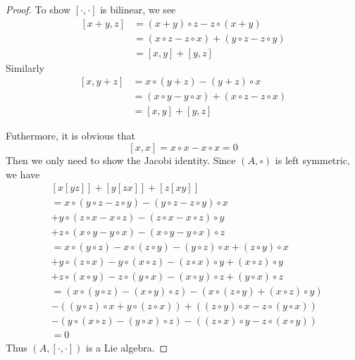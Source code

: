 \documentclass[../main.tex]{subfiles}
\begin{document}
\begin{proof}
    To show \(  \left[ \cdot ,\cdot  \right]   \) is bilinear, we  see  \[
    \begin{aligned}
    \left[ x+ y,z \right]&= \left( x+ y \right)\circ z- z\circ\left( x+ y \right)    \\ 
     &= \left( x\circ z - z\circ x \right) +\left(  y\circ z - z \circ y \right) \\ 
      &=  \left[ x,y \right]+ \left[ y,z \right]  
    \end{aligned}
    \]  Similarly \[
    \begin{aligned}
    \left[ x,y+ z \right]&= x\circ \left( y+ z \right)- \left( y+ z \right)\circ x\\ 
     &= \left( x\circ y- y\circ x \right)+ \left( x\circ z-z\circ x \right)\\ 
      &= \left[ x,y \right]+ \left[ y,z \right]        
    \end{aligned}
    \]

    Futhermore, it is obvious that \[
    \left[ x,x \right]= x\circ x-x\circ x= 0 
    \]
  Then we only need to show the Jacobi identity. 
 Since \(  \left( A,\circ  \right)   \) is left symmetric, we have 
    \[
    \begin{aligned}
    & \left[ x\left[ yz \right]  \right]+ \left[ y\left[ zx \right]  \right]+ \left[ z\left[ xy \right]  \right]   \\ 
     &= x\circ \left( y\circ z - z\circ y \right)- \left( y\circ z - z \circ y \right)\circ x\\ 
      &+  y\circ \left( z\circ x - x \circ z \right)-\left( z\circ x - x \circ z  \right)\circ y\\ 
       &+  z\circ \left( x\circ y-y\circ x \right)-\left( x\circ y-y\circ x \right)\circ z\\ 
        &= x\circ \left( y\circ z \right)- x\circ \left( z\circ y \right)-\left( y\circ z  \right)\circ x + \left( z\circ y \right)\circ x\\ 
         &+ y\circ \left( z\circ x \right)-y\circ \left( x\circ z \right)-\left( z\circ x  \right)\circ y             + \left( x\circ z \right)\circ y\\ 
          &+ z\circ \left( x\circ y \right) -z\circ \left( y\circ x \right)-\left( x\circ y \right)\circ z + \left( y\circ x \right)\circ z\\ 
           &=  \left( x\circ \left( y\circ z \right)-\left( x\circ y \right)\circ z   \right)- \left( x\circ \left( z\circ y \right)+ \left( x\circ z \right)\circ y   \right)\\ 
            &- \left( \left( y\circ z \right)\circ x  + y\circ \left( z\circ x \right) \right)+ \left( \left( z\circ y \right)\circ x-z\circ \left( y\circ x \right)   \right)\\ 
             &- \left( y\circ \left( x\circ z \right)- \left( y\circ x \right)\circ z   \right)-\left( \left( z\circ x \right)\circ y -z\circ \left( x\circ y \right)   \right)\\ 
              &= 0       
    \end{aligned}
    \] Thus \(  \left( A,\left[ \cdot ,\cdot  \right]  \right)    \) is a Lie algebra. 
\end{proof}
\end{document}
